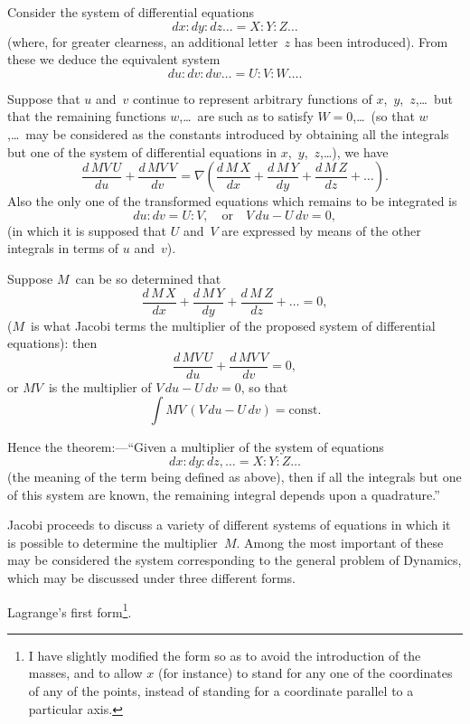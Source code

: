 \documentclass[11pt,a4paper]{book}
\begin{document}
 Consider the system of differential equations
\[
dx : dy : dz\ldots = X : Y : Z\ldots
\]
(where, for greater clearness, an additional letter~$z$ has been introduced). From these we deduce the equivalent system
\[
du : dv : dw\ldots = U : V : W\ldots.
\]

\newpage
Suppose that $u$ and~$v$ continue to represent arbitrary functions of $x$,~$y$,~$z$,\ldots\ but that the remaining functions $w$,\ldots\ are such as to satisfy $W=0$,\ldots\ (so that $w$,\ldots\ may be considered as the constants introduced by obtaining all the integrals but one of the system of differential equations in $x$,~$y$,~$z$,\ldots), we have
\[
\frac{d\,MV\,U}{du} + \frac{d\,MV\,V}{dv} = \nabla\left(\frac{d\,M\,X}{dx} + \frac{d\,M\,Y}{dy} + \frac{d\,M\,Z}{dz} + \ldots\right).
\]
Also the only one of the transformed equations which remains to be integrated is
\[
du : dv = U : V, \quad \text{or}\quad V\,du - U\,dv = 0,
\]
(in which it is supposed that $U$ and~$V$ are expressed by means of the other integrals in terms of $u$ and~$v$).

Suppose $M$~can be so determined that
\[
\frac{d\,M\,X}{dx} + \frac{d\,M\,Y}{dy} + \frac{d\,M\,Z}{dz} + \ldots = 0,
\]
($M$~is what Jacobi terms the multiplier of the proposed system of differential equations): then
\[
\frac{d\,MV\,U}{du} + \frac{d\,MV\,V}{dv} = 0,
\]
or $MV$~is the multiplier of $V\,du - U\,dv = 0$, so that
\[
\int MV\,(V\,du - U\,dv) = \text{const.}
\]

Hence the theorem:---``Given a multiplier of the system of equations
\[
dx : dy : dz,\ldots = X : Y : Z\ldots
\]
(the meaning of the term being defined as above), then if all the integrals but one of this system are known, the remaining integral depends upon a quadrature.''

Jacobi proceeds to discuss a variety of different systems of equations in which it is possible to determine the multiplier~$M$. Among the most important of these may be considered the system corresponding to the general problem of Dynamics, which may be discussed under three different forms.

\vspace{10pt}

 Lagrange's first form\footnote{I have slightly modified the form so as to avoid the introduction of the masses, and to allow $x$ (for instance) to stand for any one of the coordinates of any of the points, instead of standing for a coordinate parallel to a particular axis.}.
\end{document}
